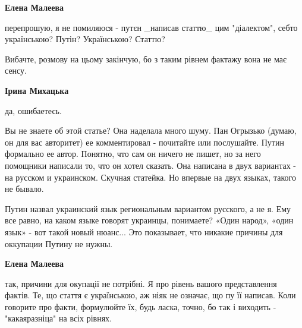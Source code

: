 \begin{itemize}
\begin{itemize}
 
\textbf{Елена Малеева} 

перепрошую, я не помиляюся - путєн \_написав статтю\_ цим "діалектом", себто
українською? Путін? Українською? Статтю?

Вибачте, розмову на цьому закінчую, бо з таким рівнем фактажу вона не має сенсу.


 
\textbf{Ірина Михацька} 

да, ошибаетесь.

Вы не знаете об этой статье? Она наделала много шуму. Пан Огрызько (думаю, он
для вас авторитет) ее комментировал - почитайте или послушайте. Путин формально
ее автор. Понятно, что сам он ничего не пишет, но за него помощники написали
то, что он хотел сказать. Она написана в двух вариантах - на русском и
украинском. Скучная статейка. Но впервые на двух языках, такого не бывало.

Путин назвал украинский язык региональным вариантом русского, а не я. Ему все
равно, на каком языке говорят украинцы, понимаете? «Один народ», «один язык» -
вот такой новый нюанс... Это показывает, что никакие причины для оккупации Путину
не нужны.

 
\textbf{Елена Малеева} 

так, причини для окупації не потрібні. Я про рівень вашого представлення
фактів. Те, що стаття є українською, аж ніяк не означає, що пу її написав. Коли
говорите про факти, формулюйте їх, будь ласка, точно, бо так і виходить -
"какаяразніца" на всіх рівнях.


 

\end{itemize}
\end{itemize}
